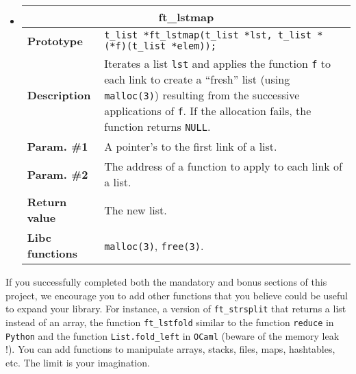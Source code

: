 \documentclass{42-en}
\begin{document}
\begin{itemize}
            \item \begin{tabular}{|l|p{11cm}|}
                \hline
                \multicolumn{2}{|c|}{\textbf{ft\_lstmap}}\\
                \hline
                \textbf{Prototype} &
                \texttt{t\_list *\hspace{5mm}ft\_lstmap(t\_list *lst,
                  t\_list * (*f)(t\_list *elem));}\\
                \hline
                \textbf{Description} & Iterates a list \texttt{lst}
                and applies the function \texttt{f} to each link to
                create a ``fresh'' list (using \texttt{malloc(3)})
                resulting from the successive applications of \texttt{f}.
                If the allocation fails, the function returns
                \texttt{NULL}.\\
                \hline
                \textbf{Param. \#1} & A pointer's to the
                first link of a list.\\
                \hline
                \textbf{Param. \#2} & The address of a function to
                apply to each link of a list.\\
                \hline
                \textbf{Return value} & The new list.\\
                \hline
                \textbf{Libc functions} & \texttt{malloc(3)},
                \texttt{free(3)}.\\
                \hline
            \end{tabular}

    \end{itemize}

    \vspace{1cm}

    If you successfully completed both the mandatory and bonus
    sections of this project, we encourage you to add other functions
    that you believe could be useful to expand your library. For
    instance, a version of \texttt{ft\_strsplit} that returns a list
    instead of an array, the function \texttt{ft\_lstfold} similar to
    the function \texttt{reduce} in \texttt{Python} and the function
    \texttt{List.fold\_left} in \texttt{OCaml} (beware of the memory
    leak !). You can add functions to manipulate arrays, stacks,
    files, maps, hashtables, etc. The limit is your imagination.
\end{document}
